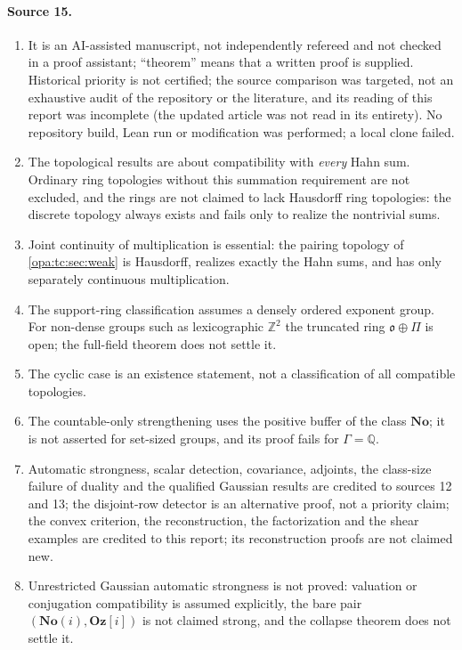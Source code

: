 \documentclass[11pt,oneside]{article}
\numberwithin{equation}{section}
\theoremstyle{definition}
\theoremstyle{remark}
\newcommand{\No}{\mathbf{No}}
\newcommand{\Og}{\mathbf{Oz}[i]}
\newcommand{\SC}{\mathbf{No}(i)}
\newcommand{\Q}{\mathbb Q}
\newcommand{\Z}{\mathbb Z}
\newcommand{\oo}{\mathfrak o}
\begin{document}
\paragraph{Source 15.}
\begin{enumerate}[itemsep=1pt]
\item It is an AI-assisted manuscript, not independently refereed and not checked in a proof assistant;
``theorem'' means that a written proof is supplied. Historical priority is not certified; the source
comparison was targeted, not an exhaustive audit of the repository or the literature, and its reading of
this report was incomplete (the updated article was not read in its entirety). No repository build, Lean run
or modification was performed; a local clone failed.
\item The topological results are about compatibility with \emph{every} Hahn sum. Ordinary ring topologies
without this summation requirement are not excluded, and the rings are not claimed to lack Hausdorff ring
topologies: the discrete topology always exists and fails only to realize the nontrivial sums.
\item Joint continuity of multiplication is essential: the pairing topology of \cref{opa:tc:sec:weak} is
Hausdorff, realizes exactly the Hahn sums, and has only separately continuous multiplication.
\item The support-ring classification assumes a densely ordered exponent group. For non-dense groups such as
lexicographic $\Z^2$ the truncated ring $\oo\oplus\Pi$ is open; the full-field theorem does not settle it.
\item The cyclic case is an existence statement, not a classification of all compatible topologies.
\item The countable-only strengthening uses the positive buffer of the class $\No$; it is not asserted for
set-sized groups, and its proof fails for $\Gamma=\Q$.
\item Automatic strongness, scalar detection, covariance, adjoints, the class-size failure of duality and the
qualified Gaussian results are credited to sources 12 and 13; the disjoint-row detector is an alternative proof,
not a priority claim; the convex criterion, the reconstruction, the factorization and the shear examples are
credited to this report; its reconstruction proofs are not claimed new.
\item Unrestricted Gaussian automatic strongness is not proved: valuation or conjugation compatibility is
assumed explicitly, the bare pair $(\SC,\Og)$ is not claimed strong, and the collapse theorem does not settle it.

\end{enumerate}
\end{document}
